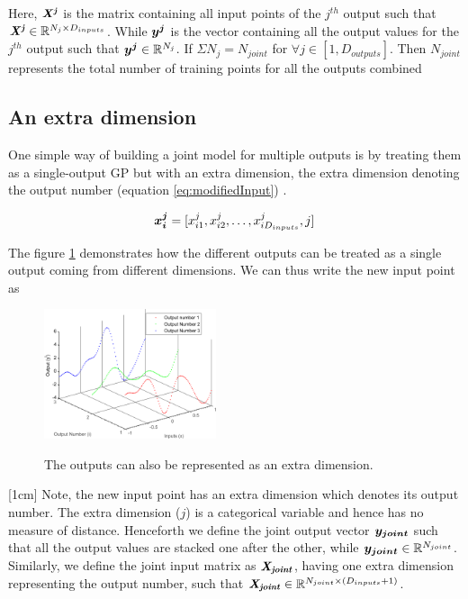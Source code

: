 Here, \(\bm{\mathit{X^j}}\) is the matrix containing all input points of the $j^{th}$ output such that \(\bm{\mathit{X^j}} \in \mathbb{R}^{N_{j} \times D_{inputs}}\). While  \(\boldsymbol{y^{j}}\) is the vector containing all the output values for the \(j^{th}\) output such that \(\boldsymbol{y^{j}} \in \mathbb{R}^{N_{j}}\). If \(\Sigma N_{j} = N_{joint}\) for \( \forall  j \in [1, D_{outputs}]\). Then \(N_{joint}\) represents the total number of training points for all the outputs combined

\subsection{An extra dimension}\label{subsecAnExtraDimension}
One simple way of building a joint model for multiple outputs is by treating them as a single-output GP but with an extra dimension, the extra dimension denoting the output number (equation \ref{eq:modifiedInput}) \cite{osborne2010bayesian}. 

\begin{equation}\label{eq:modifiedInput}
    \boldsymbol{x_{i}^{j}} = [x_{i1}^{j}, x_{i2}^{j}, \ldots, x_{iD_{inputs}}^{j}, j]
\end{equation}

The figure \ref{figoutputsAsAnExtraDimension} demonstrates how the different outputs can be treated as a single output coming from different dimensions. We can thus write the new input point as

\begin{figure}[!ht]
  \centering
        \includegraphics[width=0.45\textwidth]
        {images/part3/outputsAsAnExtraDimension}
        \label{figoutputsAsAnExtraDimension}
        \caption{The outputs can also be represented as an extra dimension.}
\end{figure}

[1cm]
Note, the new input point has an extra dimension which denotes its output number. The extra dimension ($j$) is a categorical variable and hence has no measure of distance. Henceforth we define the joint output vector \(\boldsymbol{y_{joint}}\) such that all the output values are stacked one after the other, while \(\boldsymbol{y_{joint}} \in \mathbb{R}^{N_{joint}}\). Similarly, we define the joint input matrix as \(\bm{\mathit{X_{joint}}}\), having one extra dimension representing the output number, such that \(\bm{\mathit{X_{joint}}} \in \mathbb{R}^{N_{joint} \times (D_{inputs}+1)}\).  

